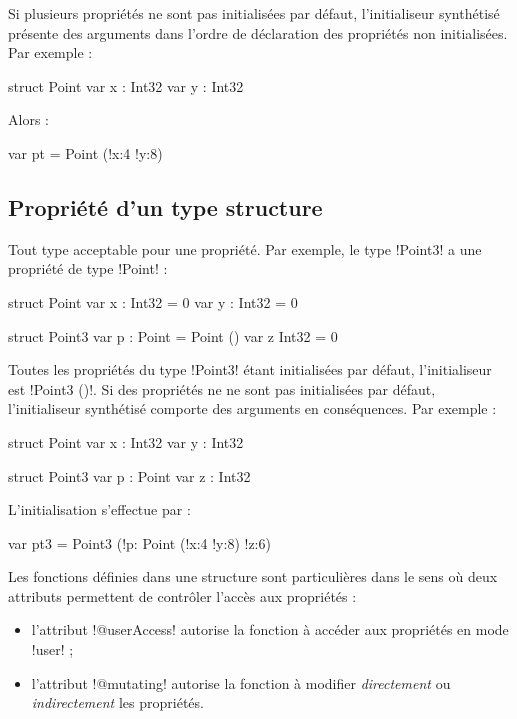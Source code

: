 Si plusieurs propriétés ne sont pas initialisées par défaut, l'initialiseur synthétisé présente des arguments dans l'ordre de déclaration des propriétés non initialisées. Par exemple :

\begin{OMNIBUS}
struct Point {
  var x : Int32
  var y : Int32
}
\end{OMNIBUS}

Alors :
\begin{OMNIBUS}
var pt = Point (!x:4 !y:8)
\end{OMNIBUS}

\subsection{Propriété d'un type structure}

Tout type acceptable pour une propriété. Par exemple, le type \omnibus!Point3! a une propriété de type \omnibus!Point! :
\begin{OMNIBUS}
struct Point {
  var x : Int32 = 0
  var y : Int32 = 0
}

struct Point3 {
  var p : Point = Point ()
  var z Int32 = 0
}
\end{OMNIBUS}

Toutes les propriétés du type \omnibus!Point3! étant initialisées par défaut, l'initialiseur est \omnibus!Point3 ()!. Si des propriétés ne ne sont pas initialisées par défaut, l'initialiseur synthétisé comporte des arguments en conséquences. Par exemple :

\begin{OMNIBUS}
struct Point {
  var x : Int32
  var y : Int32
}

struct Point3 {
  var p : Point
  var z : Int32
}
\end{OMNIBUS}

L'initialisation s'effectue par :
\begin{OMNIBUS}
var pt3 = Point3 (!p: Point (!x:4 !y:8) !z:6)
\end{OMNIBUS}













Les fonctions définies dans une structure sont particulières dans le sens où deux attributs permettent de contrôler l'accès aux propriétés :
\begin{itemize}
\item l'attribut \omnibus!@userAccess! autorise la fonction à accéder aux propriétés en mode \omnibus!user! ;
\item l'attribut \omnibus!@mutating! autorise la fonction à modifier \emph{directement} ou \emph{indirectement} les propriétés.
\end{itemize}

